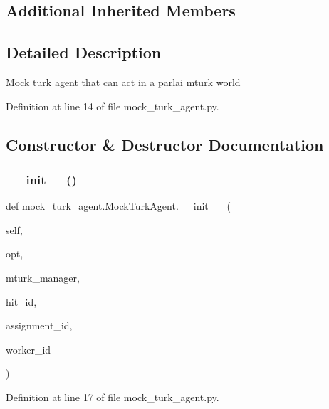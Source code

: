 \subsection*{Additional Inherited Members}


\subsection{Detailed Description}
\begin{DoxyVerb}Mock turk agent that can act in a parlai mturk world\end{DoxyVerb}
 

Definition at line 14 of file mock\+\_\+turk\+\_\+agent.\+py.



\subsection{Constructor \& Destructor Documentation}
\mbox{\label{classmock__turk__agent_1_1MockTurkAgent_a7582b967521620537272a6ad5fb4dfb0}} 
\subsubsection{\texorpdfstring{\+\_\+\+\_\+init\+\_\+\+\_\+()}{\_\_init\_\_()}}
{\footnotesize\ttfamily def mock\+\_\+turk\+\_\+agent.\+Mock\+Turk\+Agent.\+\_\+\+\_\+init\+\_\+\+\_\+ (\begin{DoxyParamCaption}\item[{}]{self,  }\item[{}]{opt,  }\item[{}]{mturk\+\_\+manager,  }\item[{}]{hit\+\_\+id,  }\item[{}]{assignment\+\_\+id,  }\item[{}]{worker\+\_\+id }\end{DoxyParamCaption})}



Definition at line 17 of file mock\+\_\+turk\+\_\+agent.\+py.




